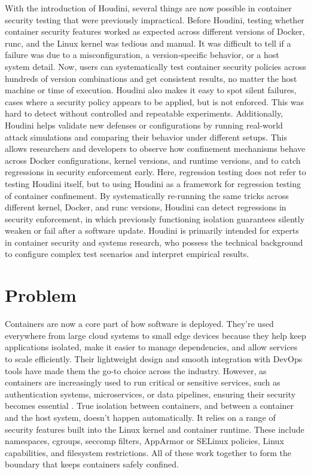 \begin{doublespace}
With the introduction of Houdini, several things are now possible in container security testing that were previously impractical. Before Houdini, testing whether container security features worked as expected across different versions of Docker, \gls{runc}, and the Linux kernel was tedious and manual. It was difficult to tell if a failure was due to a misconfiguration, a version-specific behavior, or a host system detail. Now, users can systematically test container security policies across hundreds of version combinations and get consistent results, no matter the host machine or time of execution. Houdini also makes it easy to spot silent failures, cases where a security policy appears to be applied, but is not enforced. This was hard to detect without controlled and repeatable experiments. Additionally, Houdini helps validate new defenses or configurations by running real-world attack simulations and comparing their behavior under different setups. This allows researchers and developers to observe how confinement mechanisms behave across Docker configurations, kernel versions, and runtime versions, and to catch regressions in security enforcement early. Here, \gls{regression testing} does not refer to testing Houdini itself, but to using Houdini as a framework for regression testing of container confinement. By systematically re-running the same tricks across different kernel, Docker, and runc versions, Houdini can detect regressions in security enforcement, in which previously functioning isolation guarantees silently weaken or fail after a software update. Houdini is primarily intended for experts in container security and systems research, who possess the technical background to configure complex test scenarios and interpret empirical results.


\section{Problem}

Containers are now a core part of how software is deployed. They’re used everywhere from large cloud systems to small edge devices because they help keep applications isolated, make it easier to manage dependencies, and allow services to scale efficiently. Their lightweight design and smooth integration with DevOps tools have made them the go-to choice across the industry. However, as containers are increasingly used to run critical or sensitive services, such as authentication systems, microservices, or data pipelines, ensuring their security becomes essential \cite{sultan2019container}. True isolation between containers, and between a container and the host system, doesn’t happen automatically. It relies on a range of security features built into the Linux kernel and container runtime. These include namespaces, cgroups, seccomp filters, \gls{AppArmor} or \gls{SELinux} policies, Linux capabilities, and filesystem restrictions. All of these work together to form the boundary that keeps containers safely confined.


\end{doublespace}

